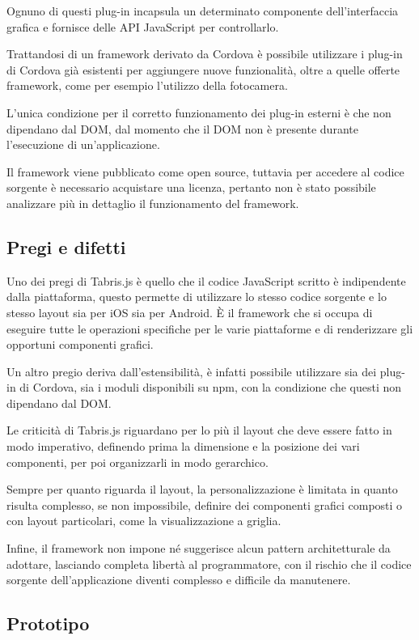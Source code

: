 Ognuno di questi plug-in incapsula un determinato componente dell'interfaccia grafica e fornisce delle API JavaScript per controllarlo.

Trattandosi di un framework derivato da Cordova è possibile utilizzare i plug-in di Cordova già esistenti per aggiungere nuove funzionalità, oltre  a quelle offerte framework, come per esempio l'utilizzo della fotocamera. 

L'unica condizione per il corretto funzionamento dei plug-in esterni è che non dipendano dal DOM, dal momento che il DOM non è presente durante l'esecuzione di un'applicazione.

Il framework viene pubblicato come open source, tuttavia per accedere al codice sorgente è necessario acquistare una licenza, pertanto non è stato possibile analizzare più in dettaglio il funzionamento del framework.

\subsection{Pregi e difetti}

Uno dei pregi di Tabris.js è quello che il codice JavaScript scritto è indipendente dalla piattaforma, questo permette di utilizzare lo stesso codice sorgente e lo stesso layout sia per iOS sia per Android.
\`E il framework che si occupa di eseguire tutte le operazioni specifiche per le varie piattaforme e di renderizzare gli opportuni componenti grafici.

Un altro pregio deriva dall'estensibilità, è infatti possibile utilizzare sia dei plug-in di Cordova, sia i moduli disponibili su \gls{npm}, con la condizione che questi non dipendano dal DOM.

Le criticità di Tabris.js riguardano per lo più il layout che deve essere fatto in modo imperativo, definendo prima la dimensione e la posizione dei vari componenti, per poi organizzarli in modo gerarchico.

Sempre per quanto riguarda il layout, la personalizzazione è limitata in quanto risulta complesso, se non impossibile, definire dei componenti grafici composti o con layout particolari, come la visualizzazione a griglia.

Infine, il framework non impone né suggerisce alcun pattern architetturale da adottare, lasciando completa libertà al programmatore, con il rischio che il codice sorgente dell'applicazione diventi complesso e difficile da manutenere.

\subsection{Prototipo}

